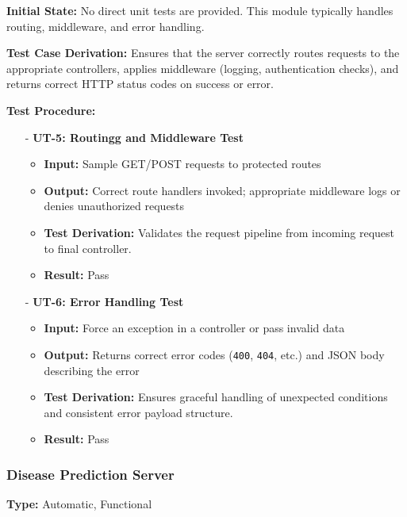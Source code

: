 \documentclass[12pt, titlepage]{article}
\begin{document}
\noindent \textbf{Initial State:} 
No direct unit tests are provided. This module typically handles routing, middleware, and error handling.
\vspace{10pt}

\noindent \textbf{Test Case Derivation:}
Ensures that the server correctly routes requests to the appropriate controllers, applies middleware (logging, authentication checks), and returns correct HTTP status codes on success or error.
\vspace{10pt}

\noindent \textbf{Test Procedure:}
\begin{itemize}
    \item[-] \textbf{UT-5: Routingg and Middleware Test} \label{test:http-routing}
    \begin{itemize}
       \item \textbf{Input:} Sample GET/POST requests to protected routes
       \item \textbf{Output:} Correct route handlers invoked; appropriate middleware logs or denies unauthorized requests
       \item \textbf{Test Derivation:} Validates the request pipeline from incoming request to final controller.
       \item \textbf{Result:} Pass
    \end{itemize}

    \item[-] \textbf{UT-6: Error Handling Test} \label{test:http-error-handling}
    \begin{itemize}
       \item \textbf{Input:} Force an exception in a controller or pass invalid data
       \item \textbf{Output:} Returns correct error codes (\texttt{400}, \texttt{404}, etc.) and JSON body describing the error
       \item \textbf{Test Derivation:} Ensures graceful handling of unexpected conditions and consistent error payload structure.
       \item \textbf{Result:} Pass
    \end{itemize}
\end{itemize}


\subsubsection{Disease Prediction Server}
\textbf{Type:} Automatic, Functional
\vspace{10pt}
\end{document}
